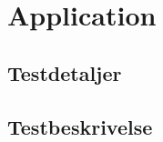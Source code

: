 \section{Application}\label{sec:testapplikation}

\subsection{Testdetaljer}



\subsection{Testbeskrivelse}
